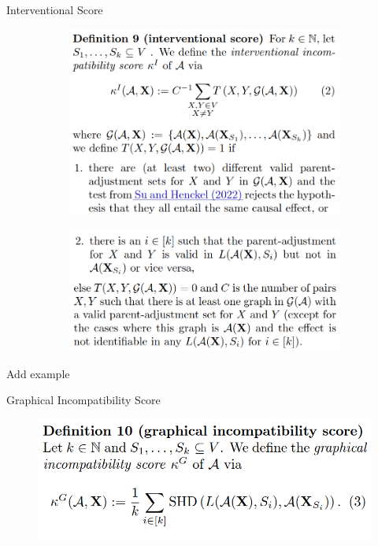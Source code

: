 \documentclass{beamer}
\begin{document}
\begin{frame}{Interventional Score}
	\begin{figure}
		\begin{subfigure}{\textwidth}
			\centering
			\includegraphics[scale=0.23]{imgs/def_9_1.png}
		\end{subfigure}
		\begin{subfigure}{\textwidth}
			\centering
			\includegraphics[scale=0.23]{imgs/def_9_2.png}
		\end{subfigure}
	\end{figure}
\end{frame}

\begin{frame}
	Add example
\end{frame}


\begin{frame}{Graphical Incompatibility Score}
	\begin{figure}
		\centering
		\includegraphics[scale=0.25]{imgs/def_10.png}
	\end{figure}
\end{frame}
\end{document}
